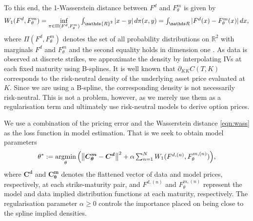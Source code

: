 \documentclass[onefignum,onetabnum]{siamonline190516}
\begin{document}
To this end, the 1-Wasserstein distance between $F^d$ and $F^m_\theta$ is given by
\begin{equation}
    W_1(F^d, F^m_\theta) = \inf_{\pi \in \Pi(F^d, F^m_\theta)}\textstyle\int_{\mathds{R}^2} |x - y|\, d\pi(x,y)
    = \textstyle\int_\R |F^d(x)-F^m_\theta(x)|\,dx,
\label{eqn:wass}   %
\end{equation}%
where $\Pi(F^d, F^m_\theta)$ denotes the set of all probability distributions on $\mathds{R}^2$ with marginals $F^d$ and $F^m_\theta$ and the second equality holds in dimension one \cite{vallender1974calculation}.
As data is observed at discrete strikes, we approximate the  density by interpolating IVs at each fixed maturity using B-splines. It is well known \cite{breeden1978prices} that $\partial_{KK} C(T,K)$ corresponds to the risk-neutral density of the underlying asset price evaluated at $K$. 
Since we are using a B-spline, the corresponding density is not necessarily risk-neutral. This is not a problem, however, as we merely use them as a regularisation term and ultimately use risk-neutral models to derive option prices.

We use a combination of the pricing error and the Wasserstein distance \eqref{eqn:wass} as the loss function in model estimation. That is we seek to obtain model parameters
\begin{equation}
\label{eqn:fitting_loss}
    \theta^*:=\operatorname*{argmin}_\theta \left( \big\lVert\boldsymbol{C^m_\theta} - \boldsymbol{C^d}\big\rVert ^ 2 + \alpha \textstyle\sum_{n=1}^N W_1(F^{d,(n)}, F^{m,(n)}_\theta) \right)\!,
\end{equation}
where $\boldsymbol{C^d}$ and $\boldsymbol{C^m_\theta}$ denotes the flattened vector of data and model prices, respectively, at each strike-maturity pair, and $F^{d,(n)}$ and $F^{m,(n)}_\theta$ represent the model and data implied distribution functions at each maturity, respectively.
The regularisation parameter $\alpha \geq 0$  controls the importance placed on being close to the spline implied densities. 
\end{document}
